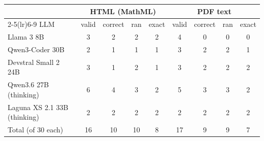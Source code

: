 \begin{tabular}{@{}lcccccccc@{}}\toprule
& \multicolumn{4}{c}{HTML (MathML)} & \multicolumn{4}{c}{PDF text} \\ \cmidrule(lr){2-5}\cmidrule(lr){6-9}
LLM & valid & correct & ran & exact & valid & correct & ran & exact \\ \midrule
Llama 3 8B & 3 & 2 & 2 & 2 & 4 & 0 & 0 & 0 \\
Qwen3-Coder 30B & 2 & 1 & 1 & 1 & 3 & 2 & 2 & 1 \\
Devstral Small 2 24B & 3 & 1 & 2 & 1 & 3 & 2 & 2 & 2 \\
Qwen3.6 27B (thinking) & 6 & 4 & 3 & 2 & 5 & 3 & 3 & 2 \\
Laguna XS 2.1 33B (thinking) & 2 & 2 & 2 & 2 & 2 & 2 & 2 & 2 \\
\midrule
Total (of 30 each) & 16 & 10 & 10 & 8 & 17 & 9 & 9 & 7 \\
\bottomrule\end{tabular}